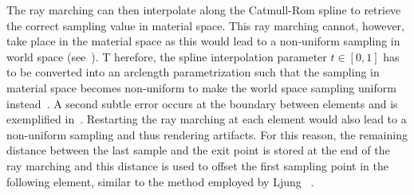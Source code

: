 The ray marching can then interpolate along the Catmull-Rom spline to retrieve the correct sampling value in material space.  This ray marching cannot, however, take place in the material space as this would lead to a non-uniform sampling in world space (see~). T herefore, the spline interpolation parameter $t \in [0,1]$ has to be converted into an arclength parametrization such that the sampling in material space becomes non-uniform to make the world space sampling uniform instead~\cite{guenter90arclength}.  A second subtle error occurs at the boundary between elements and is exemplified in~.  Restarting the ray marching at each element would also lead to a non-uniform sampling and thus rendering artifacts.  For this reason, the remaining distance between the last sample and the exit point is stored at the end of the ray marching and this distance is used to offset the first sampling point in the following element, similar to the method employed by Ljung \etal~\cite{ljung2006adaptive}.

